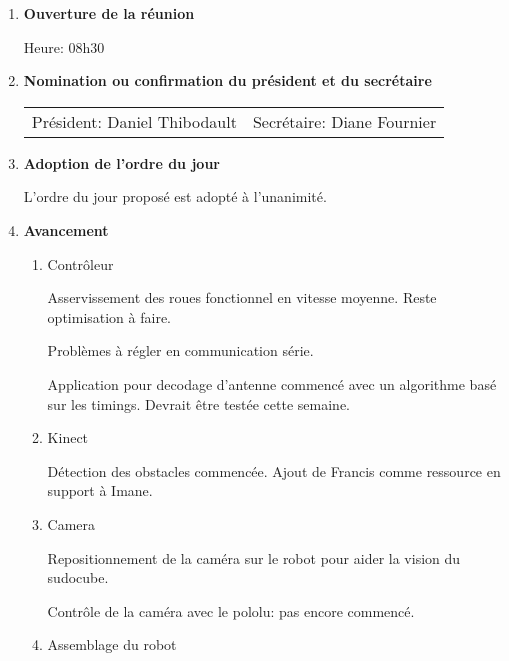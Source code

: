 \documentclass[12pt]{ULojpv}
\begin{document}
\entete
\begin{enumerate}
\item \textbf{Ouverture de la réunion}

Heure: 08h30


\item \textbf{Nomination ou confirmation du président et du secrétaire}

\begin{tabular}{@{}ll}
   Président: Daniel Thibodault
   & Secrétaire: Diane Fournier
\end{tabular}


\item \textbf{Adoption de l'ordre du jour}

L'ordre du jour proposé est adopté à l'unanimité.


\item \textbf{Avancement}

\begin{enumerate}

\item Contrôleur

Asservissement des roues fonctionnel en vitesse moyenne. Reste optimisation à faire.

Problèmes à régler en communication série.

Application pour decodage d'antenne commencé avec un algorithme basé sur les timings. Devrait être testée cette semaine.


\item Kinect

Détection des obstacles commencée. Ajout de Francis comme ressource en support à Imane.

\item Camera

Repositionnement de la caméra sur le robot pour aider la vision du sudocube.

Contrôle de la caméra avec le pololu: pas encore commencé.

\item Assemblage du robot


\end{enumerate}
\end{enumerate}
\end{document}

